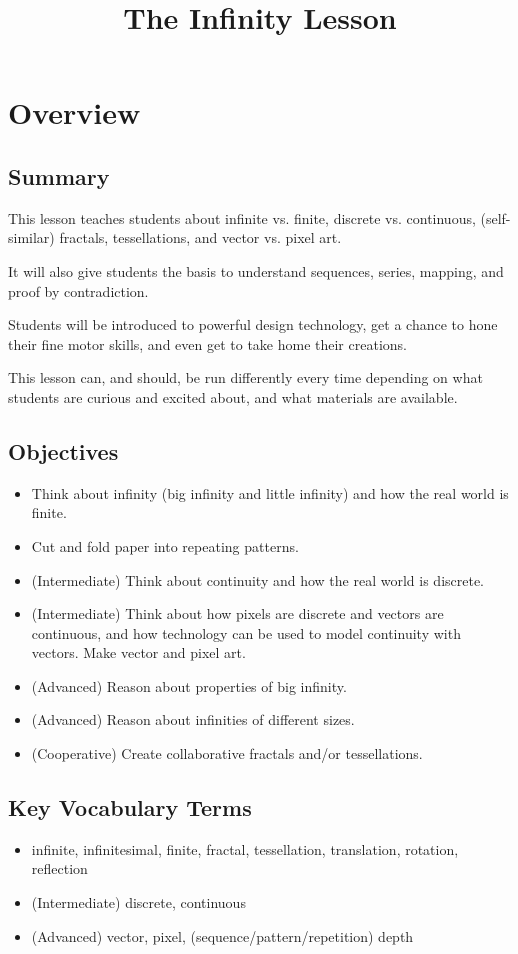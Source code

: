 \documentclass{lessonplan}
\title{The Infinity Lesson}
\author{\linkHome}
\date{}
\begin{document}
  \maketitle

  \section{Overview}
    \subsection{Summary}
      This lesson teaches students about infinite vs. finite, discrete vs. continuous, (self-similar) fractals, 
      tessellations, and vector vs. pixel art.

      It will also give students the basis to understand sequences, series, mapping, and proof by contradiction. 

      Students will be introduced to powerful design technology, get a chance to hone their fine motor skills, and 
      even get to take home their creations.

      This lesson can, and should, be run differently every time depending on what students are curious and excited
      about, and what materials are available.
    \subsection{Objectives}
    \begin{itemize}
      \item Think about infinity (big infinity and little infinity) and how the real world is finite.
      \item Cut and fold paper into repeating patterns.
      \item (Intermediate) Think about continuity and how the real world is discrete.
      \item (Intermediate) Think about how pixels are discrete and vectors are continuous, and how technology can be 
        used to model continuity with vectors. Make vector and pixel art.
      \item (Advanced) Reason about properties of big infinity.
      \item (Advanced) Reason about infinities of different sizes.
      \item (Cooperative) Create collaborative fractals and/or tessellations.
    \end{itemize}
    \subsection{Key Vocabulary Terms}
    \begin{itemize}
      \item infinite, infinitesimal, finite, fractal, tessellation, translation, rotation, reflection
      \item (Intermediate) discrete, continuous
      \item (Advanced) vector, pixel, (sequence/pattern/repetition) depth
    \end{itemize}
\end{document}
